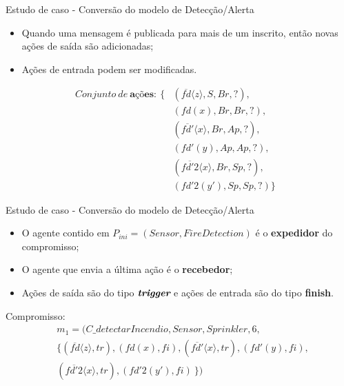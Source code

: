 \documentclass[12pt,xcolor={usenames,dvipsnames}]{beamer}
\begin{document}
\begin{frame}{Estudo de caso - Conversão do modelo de Detecção/Alerta}

\begin{itemize}
	\item Quando uma mensagem é publicada para mais de um inscrito, então novas ações de saída são adicionadas;
	\item Ações de entrada podem ser modificadas.
\end{itemize}

\begin{eqnarray}
Conjunto~de~\textbf{ações}:~\{ &(\overline{fd}\langle z \rangle, S, Br, ?),& \nonumber \\
&(fd(x), Br, Br, ?),& \nonumber \\
&(\overline{fd'}\langle x \rangle, Br, Ap, ?),& \nonumber \\
&(fd'(y), Ap, Ap, ?),& \nonumber \\
&(\overline{fd'2}\langle x \rangle, Br, Sp, ?),& \nonumber \\
&(fd'2(y'), Sp, Sp, ?) \}& \nonumber 
\end{eqnarray}

\end{frame}

\begin{frame}{Estudo de caso - Conversão do modelo de Detecção/Alerta}
\begin{itemize}
	\item O agente contido em $P_{ini} = (Sensor, FireDetection)$ é o \textbf{expedidor} do compromisso;
	\item O agente que envia a última ação é o \textbf{recebedor};
	\item Ações de saída são do tipo $\textit{\textbf{trigger}}$ e ações de entrada são do tipo \textbf{finish\textit{}}.
\end{itemize}
Compromisso:
\begin{align}
& m_{1} = (C\_detectarIncendio, Sensor, Sprinkler, 6, \nonumber \\
& \{ (\overline{fd}\langle z \rangle, tr), (fd(x), fi), (\overline{fd'}\langle x \rangle, tr), (fd'(y), fi), \nonumber \\ &(\overline{fd'2}\langle x \rangle, tr), (fd'2(y'), fi)~\}) \nonumber
\end{align}
\end{frame}
\end{document}

